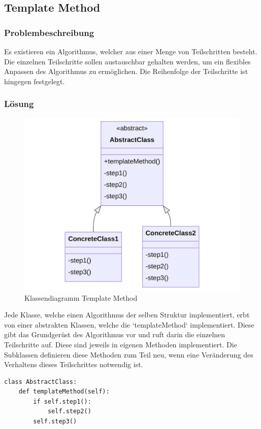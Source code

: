 \subsection{Template Method}

\subsubsection*{Problembeschreibung}

Es existieren ein Algorithmus, welcher aus einer Menge von Teilschritten besteht. Die einzelnen Teilschritte sollen austauschbar gehalten werden, um ein flexibles Anpassen des Algorithmus zu ermöglichen. Die Reihenfolge der Teilschritte ist hingegen festgelegt. 

\subsubsection*{Lösung}

\begin{figure}[!hb]
	\centering
	\includegraphics[width=0.75\linewidth]{images/patterns/template-method-class.png}
	\caption{Klassendiagramm Template Method}
	\label{fig:template-method-class}
\end{figure}

Jede Klasse, welche einen Algorithmus der selben Struktur implementiert, erbt von einer abstrakten Klassen, welche die `templateMethod` implementiert. Diese gibt das Grundgerüst des Algorithmus vor und ruft darin die einzelnen Teilschritte auf. Diese sind jeweils in eigenen Methoden implementiert. Die Subklassen definieren diese Methoden zum Teil neu, wenn eine Veränderung des Verhaltens dieses Teilschrittes notwendig ist.


\lstset{language=python}
\begin{lstlisting}[caption={Quelltextunterschrift}, label=code:template-method-code]
class AbstractClass:
	def templateMethod(self):
    	if self.step1():
        	self.step2()
    	self.step3()
\end{lstlisting}


